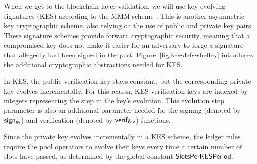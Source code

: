 When we get to the blockchain layer validation, we will use
key evolving signatures (KES) according to the MMM scheme \cite{cryptoeprint:2001:034}.
This is another asymmetric key cryptographic scheme, also relying on
the use of public and private key pairs.
These signature schemes provide forward cryptographic security, meaning that a
compromised key does not make it easier for an adversary to forge a signature that
allegedly had been signed in the past.
Figure~\ref{fig:kes-defs-shelley} introduces the additional cryptographic abstractions
needed for KES.

In KES, the public verification key stays constant, but the
corresponding private key evolves incrementally. For this reason, KES
verification keys are indexed by integers representing the step in the key's
evolution. This evolution step parameter is also an additional parameter needed
for the signing (denoted by $\mathsf{sign_{ev}}$) and verification
(denoted by $\mathsf{verify_{ev}}$) functions.

Since the private key evolves incrementally in a KES scheme, the ledger rules
require the pool operators to evolve their keys every time a certain number of
slots have passed, as determined by the global constant $\mathsf{SlotsPerKESPeriod}$.

